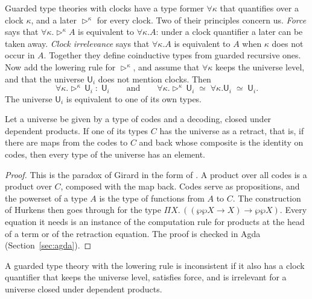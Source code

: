\documentclass[acmsmall,nonacm,screen]{acmart}
\newcommand{\later}{{\triangleright}}
\newcommand{\Uv}{\mathsf{U}}
\begin{document}
Guarded type theories with clocks \citep{AtkeyMcBride2013,CloTT2017} have a type former
$\forall\kappa$ that quantifies over a clock $\kappa$, and a later $\later^\kappa$ for every
clock. Two of their principles concern us. \emph{Force} says that
$\forall\kappa.\later^\kappa A$ is equivalent to $\forall\kappa.A$: under a clock quantifier
a later can be taken away. \emph{Clock irrelevance} says that $\forall\kappa.A$ is equivalent
to $A$ when $\kappa$ does not occur in $A$. Together they define coinductive types from
guarded recursive ones. Now add the lowering rule for $\later^\kappa$, and assume that
$\forall\kappa$ keeps the universe level, and that the universe $\Uv_i$ does not mention
clocks. Then
\[
  \forall\kappa.\later^\kappa\,\Uv_i \;:\; \Uv_i
  \qquad\text{and}\qquad
  \forall\kappa.\later^\kappa\,\Uv_i \;\simeq\; \forall\kappa.\Uv_i \;\simeq\; \Uv_i .
\]
The universe $\Uv_i$ is equivalent to one of its own types.

\begin{theorem}[Collapse]\label{thm:collapse}
Let a universe be given by a type of codes and a decoding, closed under dependent products.
If one of its types $C$ has the universe as a retract, that is, if there are maps from the
codes to $C$ and back whose composite is the identity on codes, then every type of the
universe has an element.
\end{theorem}

\begin{proof}
This is the paradox of Girard \citep{Coquand1986} in the form of \citet{Hurkens1995}. A
product over all codes is a product over $C$, composed with the map back. Codes serve as
propositions, and the powerset of a type $A$ is the type of functions from $A$ to $C$. The
construction of Hurkens then goes through for the type
$\Pi X.\,((\wp\wp X \to X) \to \wp\wp X)$. Every equation it needs is an instance of the
computation rule for products at the head of a term or of the retraction equation. The
proof is checked in Agda (Section~\ref{sec:agda}).
\end{proof}

\begin{corollary}\label{cor:clocks}
A guarded type theory with the lowering rule is inconsistent if it also has a clock
quantifier that keeps the universe level, satisfies force, and is irrelevant for a
universe closed under dependent products.
\end{corollary}
\end{document}
